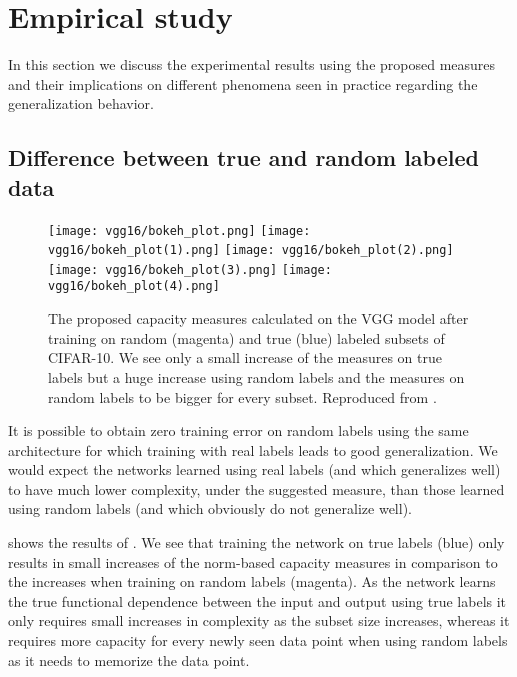 \section{Empirical study}
\label{sec:empricial-study}
In this section we discuss the experimental results using the proposed measures and their implications on different phenomena seen in practice regarding the generalization behavior.
%
\subsection{Difference between true and random labeled data}
\begin{figure}[h]
	\centering
	\texttt{[image: vgg16/bokeh\_plot.png]}
	\texttt{[image: vgg16/bokeh\_plot(1).png]}
	\texttt{[image: vgg16/bokeh\_plot(2).png]}\\
	\texttt{[image: vgg16/bokeh\_plot(3).png]}
	\texttt{[image: vgg16/bokeh\_plot(4).png]}
	\caption{The proposed capacity measures calculated on the VGG model \cite{simonyan2014deep} after training on random (magenta) and true (blue) labeled subsets of CIFAR-10. We see only a small increase of the measures on true labels but a huge increase using random labels and the measures on random labels to be bigger for every subset. Reproduced from \cite{neyshabur2017exploring}.}	
	\label{fig:norms-paper}
\end{figure}
It is possible to obtain zero training error on random labels using the same architecture for which training with real labels leads to good generalization. We would expect the networks learned using real labels (and which generalizes well) to have much lower complexity, under the suggested measure, than those learned using random labels (and which obviously do not generalize well). \cite{neyshabur2017exploring} \par
%
 shows the results of \cite{neyshabur2017exploring}. We see that training the network on true labels (blue) only results in small increases of the norm-based capacity measures in comparison to the increases when training on random labels (magenta). As the network learns the true functional dependence between the input and output using true labels it only requires small increases in complexity as the subset size increases, whereas it requires more capacity for every newly seen data point when using random labels as it needs to memorize the data point.\\
